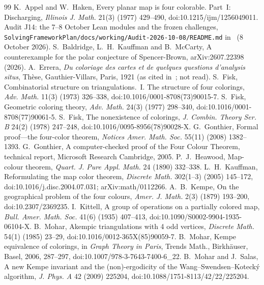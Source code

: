 \documentclass[11pt]{article}
\theoremstyle{definition}
\begin{document}
\begin{footnotesize}
\begin{thebibliography}{99}\setlength{\itemsep}{0pt}\setlength{\parsep}{0pt}
 K.~Appel and W.~Haken, Every planar map is four colorable. Part~I: Discharging, \emph{Illinois J. Math.} 21(3) (1977) 429--490, doi:10.1215/ijm/1256049011.
 Audit J14: the 7--8 October Lean modules and the frozen challenges, \texttt{SolvingFrameworkPlan/docs/working/Audit-2026-10-08/README.md} in~\cite{record} (8 October 2026).
 S.~Baldridge, L.~H.~Kauffman and B.~McCarty, A counterexample for the polar conjecture of Spencer-Brown, arXiv:2607.22398 (2026).
 A.~Errera, \emph{Du coloriage des cartes et de quelques questions d'analysis situs}, Th\`ese, Gauthier-Villars, Paris, 1921 (as cited in~\cite{kittell1935}; not read).
 S.~Fisk, Combinatorial structure on triangulations.~I. The structure of four colorings, \emph{Adv. Math.} 11(3) (1973) 326--338, doi:10.1016/0001-8708(73)90015-7.
 S.~Fisk, Geometric coloring theory, \emph{Adv. Math.} 24(3) (1977) 298--340, doi:10.1016/0001-8708(77)90061-5.
 S.~Fisk, The nonexistence of colorings, \emph{J. Combin. Theory Ser. B} 24(2) (1978) 247--248, doi:10.1016/0095-8956(78)90028-X.
 G.~Gonthier, Formal proof---the four-color theorem, \emph{Notices Amer. Math. Soc.} 55(11) (2008) 1382--1393.
 G.~Gonthier, A computer-checked proof of the Four Colour Theorem, technical report, Microsoft Research Cambridge, 2005.
 P.~J.~Heawood, Map-colour theorem, \emph{Quart. J. Pure Appl. Math.} 24 (1890) 332--338.
 L.~H.~Kauffman, Reformulating the map color theorem, \emph{Discrete Math.} 302(1--3) (2005) 145--172, doi:10.1016/j.disc.2004.07.031; arXiv:math/0112266.
 A.~B.~Kempe, On the geographical problem of the four colours, \emph{Amer. J. Math.} 2(3) (1879) 193--200, doi:10.2307/2369235.
 I.~Kittell, A group of operations on a partially colored map, \emph{Bull. Amer. Math. Soc.} 41(6) (1935) 407--413, doi:10.1090/S0002-9904-1935-06104-X.
 B.~Mohar, Akempic triangulations with 4 odd vertices, \emph{Discrete Math.} 54(1) (1985) 23--29, doi:10.1016/0012-365X(85)90059-7.
 B.~Mohar, Kempe equivalence of colorings, in \emph{Graph Theory in Paris}, Trends Math., Birkh\"auser, Basel, 2006, 287--297, doi:10.1007/978-3-7643-7400-6\_22.
 B.~Mohar and J.~Salas, A new Kempe invariant and the (non)-ergodicity of the Wang--Swendsen--Koteck\'y algorithm, \emph{J. Phys. A} 42 (2009) 225204, doi:10.1088/1751-8113/42/22/225204.

\end{thebibliography}
\end{footnotesize}
\end{document}
